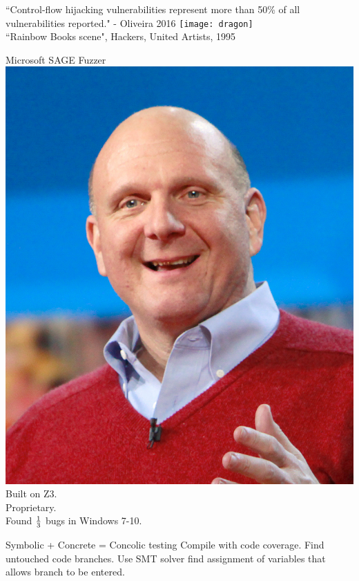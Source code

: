 \documentclass{beamer}
\begin{document}
\begin{frame}[fragile]
``Control-flow hijacking vulnerabilities represent more than 50\% of all vulnerabilities reported." - Oliveira 2016
\texttt{[image: dragon]}
\\``Rainbow Books scene", Hackers, United Artists, 1995
\end{frame}

\begin{frame}[fragile]
Microsoft SAGE Fuzzer
\includegraphics[scale=0.5]{sage}\\
Built on Z3. \\ Proprietary. \\Found ${1\over 3}$ bugs in Windows 7-10.
\end{frame}

\begin{frame}[fragile]
Symbolic + Concrete = Concolic testing\newline
\newline\newline Compile with code coverage. 
\newline\newline Find untouched code branches.
\newline\newline Use SMT solver find assignment of variables that allows branch to be entered.
\end{frame}
\end{document}
